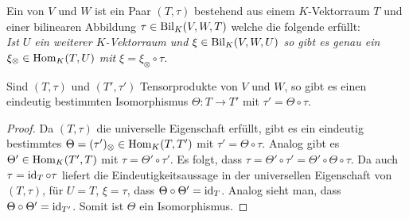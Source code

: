 \begin{definition}[Tensorprodukt]
	Ein  von $V$ und $W$ ist ein Paar $(T,\tau)$ bestehend aus einem $K$-Vektorraum $T$ und einer bilinearen Abbildung $\tau\in\operatorname{Bil}_K(V,W,T)$ welche die folgende  erfüllt: \\
	\textit{Ist $U$ ein weiterer $K$-Vektorraum und $\xi\in\operatorname{Bil}_K(V,W,U)$ so gibt es genau ein $\xi_\otimes\in\operatorname{Hom}_K(T,U)$ mit $\xi=\xi_\otimes\circ\tau$.}
	\begin{center}
	\end{center}
\end{definition}

\begin{lemma}
	Sind $(T,\tau)$ und $(T',\tau')$ Tensorprodukte von $V$ und $W$, so gibt es einen eindeutig bestimmten Isomorphismus $\Theta:T\to T'$ mit $\tau'=\Theta\circ\tau$.
	\begin{center}
	\end{center}
\end{lemma}
\begin{proof}
	Da $(T,\tau)$ die universelle Eigenschaft erfüllt, gibt es ein eindeutig bestimmtes $\Theta=(\tau')_\otimes\in\operatorname{Hom}_K(T,T')$ mit $\tau'=\Theta\circ\tau$. Analog gibt es $\Theta'\in\operatorname{Hom}_K(T',T)$ mit $\tau=\Theta'\circ\tau'$. Es folgt, dass $\tau=\Theta'\circ\tau'= \Theta'\circ\Theta\circ\tau$. Da auch $\tau=\operatorname{id}_T\circ\tau$ liefert die Eindeutigkeitsaussage in der universellen Eigenschaft von $(T,\tau)$, für $U=T$, $\xi=\tau$, dass $\Theta\circ\Theta'=\operatorname{id}_T$. Analog sieht man, dass $\Theta\circ\Theta'=\operatorname{id}_{T'}$. Somit ist $\Theta$ ein Isomorphismus.
\end{proof}


